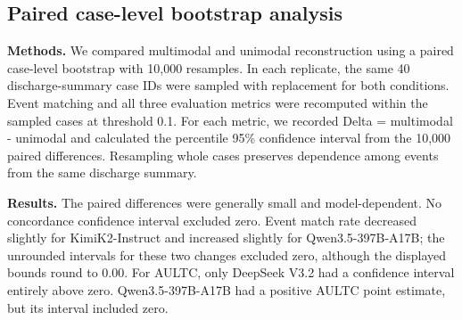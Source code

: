\FloatBarrier
\subsection{Paired case-level bootstrap analysis}\label{ch08:supp:paired-bootstrap}

\noindent\textbf{Methods.} We compared multimodal and unimodal reconstruction using a paired case-level bootstrap with 10,000 resamples. In each replicate, the same 40 discharge-summary case IDs were sampled with replacement for both conditions. Event matching and all three evaluation metrics were recomputed within the sampled cases at threshold 0.1. For each metric, we recorded Delta = multimodal - unimodal and calculated the percentile 95\% confidence interval from the 10,000 paired differences. Resampling whole cases preserves dependence among events from the same discharge summary.

\noindent
\textbf{Results.} The paired differences were generally small and model-dependent. No concordance confidence interval excluded zero. Event match rate decreased slightly for KimiK2-Instruct and increased slightly for Qwen3.5-397B-A17B; the unrounded intervals for these two changes excluded zero, although the displayed bounds round to 0.00. For AULTC, only DeepSeek V3.2 had a confidence interval entirely above zero. Qwen3.5-397B-A17B had a positive AULTC point estimate, but its interval included zero.

\par\medskip
\noindent

\par\medskip

